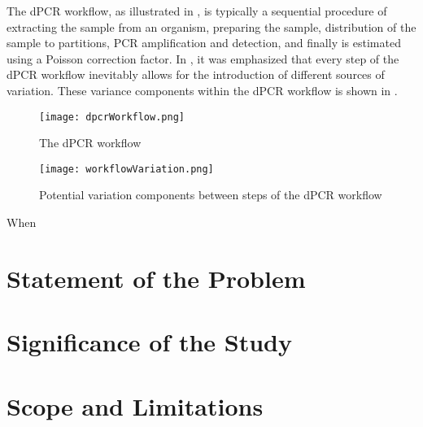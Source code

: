The dPCR workflow, as illustrated in , is typically a sequential procedure of extracting the sample from an organism, preparing the sample, distribution of the sample to partitions, PCR amplification and detection, and finally is estimated using a Poisson correction factor. In \cite{Jacobs2014}, it was emphasized that every step of the dPCR workflow inevitably allows for the introduction of different sources of variation. These variance components within the dPCR workflow is shown in . 

\begin{figure}[h]
    \centering
    \texttt{[image: dpcrWorkflow.png]}
    \caption{The dPCR workflow}
        \label{fig:dpcrWorkflow}
\end{figure}

\begin{figure}[h]
    \centering
    \texttt{[image: workflowVariation.png]}
    \caption{Potential variation components between steps of the dPCR workflow}
        \label{fig:workflowVariation}
\end{figure}

When 


\section{Statement of the Problem}
\label{sec:statementprob}

\section{Significance of the Study}
\label{sec:significancestudy}

\section{Scope and Limitations}
\label{sec:significance}
